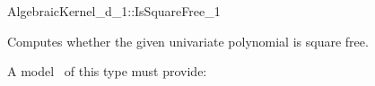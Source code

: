 \begin{ccRefConcept}{AlgebraicKernel_d_1::IsSquareFree_1}

\ccDefinition
Computes whether the given univariate polynomial is square free. 
 
\ccRefines 
{}  

A model \ccVar\ of this type must provide:

\ccOperations
{}

{}


\end{ccRefConcept} 


